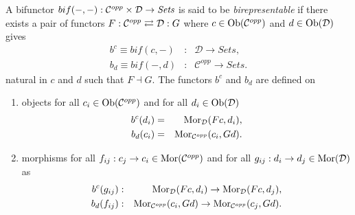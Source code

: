 \begin{frame}
\iftoggle{thmsty}{
\begin{definition}
\label{definition-birepresentable}
}{}
A bifunctor $bif (-,-): {\mathcal C}^{opp} \times {\mathcal D} \rightarrow \textit{Sets}$ is said to be {\it birepresentable} if there exists a pair of functors $F:{\mathcal C}^{opp} \rightleftarrows {\mathcal D}:G$ where $c \in \mathop{\rm Ob}\nolimits({\mathcal C}^{opp})$ and $d \in \mathop{\rm Ob}\nolimits({\mathcal D})$ gives
\begin{eqnarray*}
b^{c} \equiv bif(c,-) &:& \mathcal{D} \rightarrow \textit{Sets},\\
b_{d} \equiv bif(-,d) &:& \mathcal{C}^{opp} \rightarrow \textit{Sets}.
\end{eqnarray*}
natural in $c$ and $d$ such that $F \dashv G$. The functors $b^{c}$ and $b_{d}$ are defined on
\begin{enumerate}
\item objects for all $c_i \in \mathop{\rm Ob}\nolimits({\mathcal C}^{opp})$ and for all $d_i \in \mathop{\rm Ob}\nolimits({\mathcal D})$
\begin{eqnarray*}
b^{c} (d_i) &=& \mathop{\rm Mor}\nolimits_{{\mathcal D}}(Fc,d_i),\\
b_{d} (c_i) &=& \mathop{\rm Mor}\nolimits_{{\mathcal C}^{opp}}(c_i,Gd).
\end{eqnarray*}
\item morphisms for all $f_{ij}:c_j \rightarrow c_i \in \mathop{\rm Mor}\nolimits({\mathcal C}^{opp})$ and for all $g_{ij}:d_i \rightarrow d_j \in \mathop{\rm Mor}\nolimits({\mathcal D})$ as
\begin{eqnarray*}
b^{c} (g_{ij}) &:& \mathop{\rm Mor}\nolimits_{{\mathcal D}}(Fc,d_i) \rightarrow \mathop{\rm Mor}\nolimits_{{\mathcal D}}(Fc,d_j),\\
b_{d} (f_{ij}) &:& \mathop{\rm Mor}\nolimits_{{\mathcal C}^{opp}}(c_i,Gd) \rightarrow \mathop{\rm Mor}\nolimits_{{\mathcal C}^{opp}}(c_j,Gd).
\end{eqnarray*}
\end{enumerate}
\iftoggle{thmsty}{
\end{definition}
}{}
\end{frame}